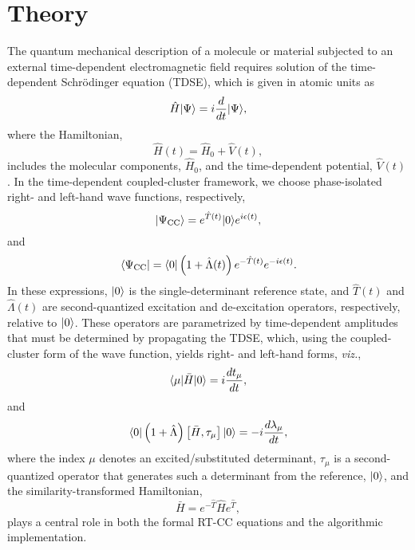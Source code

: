 \section{Theory} \label{theory}

The quantum mechanical description of a molecule or material subjected to an 
external time-dependent electromagnetic field requires solution of the time-dependent
Schr\"odinger equation (TDSE), which is given in atomic units as
\begin{equation}
\label{eq:TDSE} 
\hat{H}| \Psi \rangle = i\frac{d}{dt}| \Psi \rangle,
\end{equation}
where the Hamiltonian,
\begin{equation}
\hat{H}(t) = \hat{H}_0 + \hat{V}(t),
\end{equation}
includes the molecular components, $\hat{H}_0$, and the time-dependent potential, $\hat{V}(t)$.  In the
time-dependent coupled-cluster framework,\cite{Nascimento2016,Pedersen2019,Crawford2019} we choose phase-isolated right- and left-hand wave functions,
respectively,
\begin{equation}
| \Psi_{\rm CC} \rangle = e^{\hat{T}(t)} | 0 \rangle e^{i \epsilon(t)},
\end{equation}
and 
\begin{equation}
\langle\Psi_{\rm CC} | = \langle0 | \left(1 + \hat{\Lambda}(t)\right)
e^{-\hat{T}(t)} e^{-i \epsilon(t)}.
\end{equation}
In these expressions, $| 0 \rangle$ is the single-determinant reference state, and
$\hat{T}(t)$ and $\hat{\Lambda}(t)$ are second-quantized excitation and
de-excitation operators, respectively, relative to $| 0 \rangle$.  These operators are parametrized by 
time-dependent amplitudes that must be determined by propagating the TDSE, which, using the coupled-cluster
form of the wave function, yields right- and left-hand forms, \textit{viz.},
\begin{equation}
\langle\mu | \bar{H} | 0 \rangle = i \frac{dt_\mu}{dt},
\label{Eq:derivT}
\end{equation}
and
\begin{equation}
\langle0 | \left(1 + \hat{\Lambda}\right) \left[\bar{H}, \tau_\mu\right]
| 0 \rangle = -i \frac{d\lambda_\mu}{dt},
\label{Eq:derivL}
\end{equation}
where the index $\mu$ denotes an excited/substituted determinant, $\tau_\mu$ is a second-quantized operator
that generates such a determinant from the reference, $| 0 \rangle$, and the similarity-transformed Hamiltonian,
\begin{equation}
\bar{H} = e^{-\hat{T}} \hat{H} e^{\hat{T}},
\label{Eq:simtranH}
\end{equation}
plays a central role in both the formal RT-CC equations and the algorithmic implementation.

